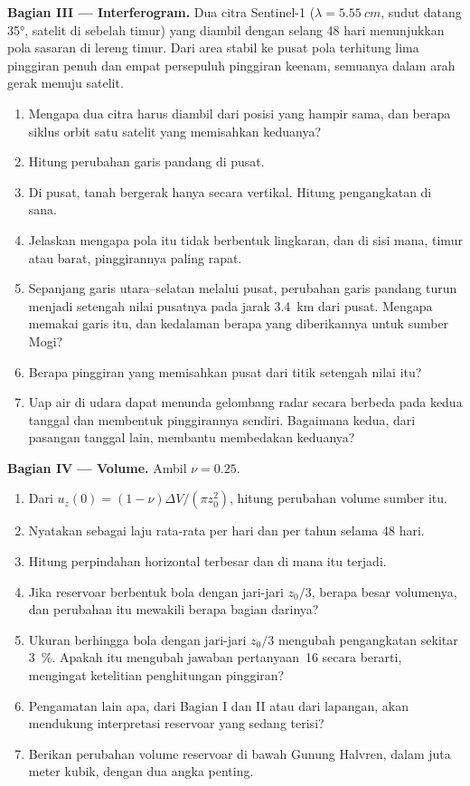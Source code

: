 \begin{problem}
\medskip\noindent\textbf{Bagian III --- Interferogram.} Dua citra Sentinel-1
($\lambda = \qty{5.55}{cm}$, sudut datang \ang{35}, satelit di sebelah
timur) yang diambil dengan selang 48 hari menunjukkan pola sasaran di lereng timur. Dari
area stabil ke pusat pola terhitung lima pinggiran penuh dan
empat persepuluh pinggiran keenam, semuanya dalam arah gerak menuju
satelit.
\begin{enumerate}[resume]
\item Mengapa dua citra harus diambil dari posisi yang hampir sama, dan berapa
  siklus orbit satu satelit yang memisahkan keduanya?
\item Hitung perubahan garis pandang di pusat.
\item Di pusat, tanah bergerak hanya secara vertikal. Hitung pengangkatan
  di sana.
\item Jelaskan mengapa pola itu tidak berbentuk lingkaran, dan di sisi mana,
  timur atau barat, pinggirannya paling rapat.
\item Sepanjang garis utara--selatan melalui pusat, perubahan garis
  pandang turun menjadi setengah nilai pusatnya pada jarak \qty{3.4}{km} dari
  pusat. Mengapa memakai garis itu, dan kedalaman berapa yang diberikannya untuk
  sumber Mogi?
\item Berapa pinggiran yang memisahkan pusat dari titik setengah nilai itu?
\item Uap air di udara dapat menunda gelombang radar secara berbeda pada
  kedua tanggal dan membentuk pinggirannya sendiri. Bagaimana  kedua,
  dari pasangan tanggal lain, membantu membedakan keduanya?
\end{enumerate}

\medskip\noindent\textbf{Bagian IV --- Volume.} Ambil $\nu = 0.25$.
\begin{enumerate}[resume]
\item Dari $u_z(0) = (1 - \nu)\Delta V/(\pi z_0^2)$, hitung perubahan
  volume sumber itu.
\item Nyatakan sebagai laju rata-rata per hari dan per tahun selama 48 hari.
\item Hitung perpindahan horizontal terbesar dan di mana itu terjadi.
\item Jika reservoar berbentuk bola dengan jari-jari $z_0/3$, berapa besar
  volumenya, dan perubahan itu mewakili berapa bagian darinya?
\item Ukuran berhingga bola dengan jari-jari $z_0/3$ mengubah pengangkatan
  sekitar \qty{3}{\percent}. Apakah itu mengubah jawaban pertanyaan~16
  secara berarti, mengingat ketelitian penghitungan pinggiran?
\item Pengamatan lain apa, dari Bagian I dan II atau dari lapangan,
  akan mendukung interpretasi reservoar yang sedang terisi?
\item Berikan perubahan volume reservoar di bawah Gunung Halvren, dalam
  juta meter kubik, dengan dua angka penting.
\end{enumerate}
\end{problem}
